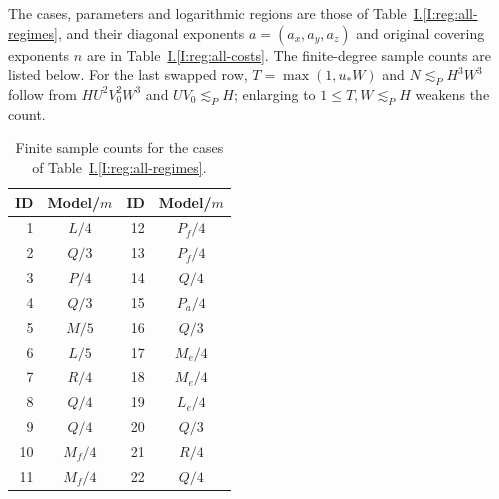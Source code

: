\documentclass[11pt]{amsart}
\theoremstyle{definition}
\theoremstyle{remark}
\numberwithin{equation}{section}
\newcommand{\partIref}[1]{\hyperref[I:#1]{I.\ref*{I:#1}}}
\begin{document}
The cases, parameters and logarithmic regions are those of Table~\partIref{reg:all-regimes}, and their diagonal exponents $a=(a_x,a_y,a_z)$ and original covering exponents $n$ are in Table~\partIref{reg:all-costs}. The finite-degree sample counts are listed below. For the last swapped row, $T=\max(1,u_*W)$ and $N\lesssim_PH^3W^3$ follow from $HU^2V_0^2W^3$ and $UV_0\lesssim_PH$; enlarging to $1\le T,W\lesssim_PH$ weakens the count.
\begin{table}[ht]
\centering
\caption{Finite sample counts for the cases of Table~\partIref{reg:all-regimes}.}\label{low:78:h3r:domains}
\begin{tabular}{rc@{\qquad}rc}
\toprule
ID & Model/$m$ & ID & Model/$m$\\
\midrule
1 & $L/4$ & 12 & $P_f/4$\\
2 & $Q/3$ & 13 & $P_f/4$\\
3 & $P/4$ & 14 & $Q/4$\\
4 & $Q/3$ & 15 & $P_a/4$\\
5 & $M/5$ & 16 & $Q/3$\\
6 & $L/5$ & 17 & $M_e/4$\\
7 & $R/4$ & 18 & $M_e/4$\\
8 & $Q/4$ & 19 & $L_e/4$\\
9 & $Q/4$ & 20 & $Q/3$\\
10 & $M_f/4$ & 21 & $R/4$\\
11 & $M_f/4$ & 22 & $Q/4$\\
\bottomrule
\end{tabular}
\end{table}
\end{document}
